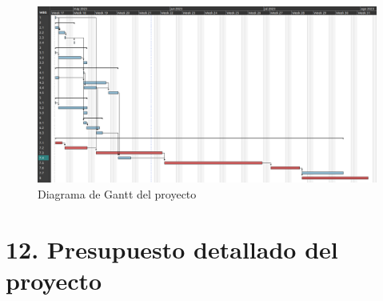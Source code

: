 \documentclass[
11pt, %
codirector, %
]{charter}
\begin{document}


\begin{landscape}
\begin{figure}[htpb]
\centering 
\includegraphics[height=.8\textheight]{./Figuras/Gantt_v1.png}
\caption{Diagrama de Gantt del proyecto}
\label{fig:diagGantt}
\end{figure}
\end{landscape}


\section{12. Presupuesto detallado del proyecto}
\label{sec:presupuesto}



\end{document}
